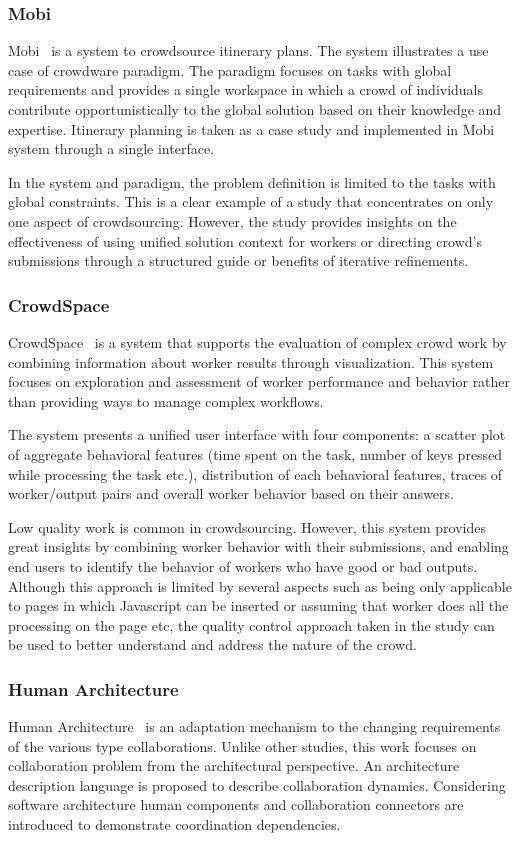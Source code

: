 \subsubsection{Mobi}
Mobi~\cite{Zhang2012} is a system to crowdsource itinerary plans. The system 
illustrates a use case of crowdware paradigm. The paradigm focuses on tasks 
with global requirements and provides a single workspace in which a crowd of 
individuals contribute opportunistically to the global solution based on their knowledge 
and expertise. Itinerary planning is taken as a case study and implemented 
in Mobi system through a single interface.

In the system and paradigm, the problem definition is limited to the tasks 
with global constraints. This is a clear example of a study that concentrates 
on only one aspect of crowdsourcing. However, the study provides insights 
on the effectiveness of using unified solution context for workers or directing 
crowd's submissions through a structured guide or benefits of iterative refinements.

\subsubsection{CrowdSpace}
CrowdSpace~\cite{Rzeszotarski2012} is a system that supports the evaluation 
of complex crowd work by combining information about worker results through 
visualization. This system focuses on exploration and assessment of worker 
performance and behavior rather than providing ways to manage complex workflows.

The system presents a unified user interface with four components: a scatter plot 
of aggregate behavioral features (time spent on the task, number of keys pressed 
while processing the task etc.), distribution of each behavioral features, 
traces of worker/output pairs and overall worker behavior based on their answers.

Low quality work is common in crowdsourcing. However, this system provides 
great insights by combining worker behavior with their submissions, and enabling 
end users to identify the behavior of workers who have good or bad outputs. 
Although this approach is limited by several aspects such as being only applicable to 
pages in which Javascript can be inserted or assuming that worker does all the processing 
on the page etc, the quality control approach taken in the study can be used to 
better understand and address the nature of the crowd.

\subsubsection{Human Architecture}
Human Architecture~\cite{Dorn2012} is an adaptation mechanism to the changing 
requirements of the various type collaborations. Unlike other studies, this work focuses 
on collaboration problem from the architectural perspective. An architecture description 
language is proposed to describe collaboration dynamics. Considering software architecture 
human components and collaboration connectors are introduced to demonstrate 
coordination dependencies. 

